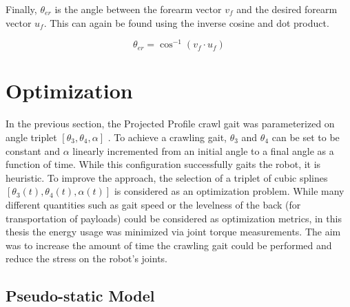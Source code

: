 Finally, $\theta_{er}$ is the angle between the forearm vector $v_f$ and the desired forearm vector $u_f$.
This can again be found using the inverse cosine and dot product.

\begin{equation}
	\theta_{er} = \cos^{-1}(v_{f} \cdot u_{f})
\end{equation}


\section{Optimization} \label{sec:crawl_optimization}

In the previous section, the Projected Profile crawl gait was parameterized on angle triplet 
$[ \theta_3, \theta_4, \alpha ]$ .
To achieve a crawling gait, $\theta_3$ and $\theta_4$ can be set to be constant and $\alpha$ linearly incremented
from an initial angle to a final angle as a function of time. While this configuration successfully gaits the robot,
it is heuristic. To improve the approach, the selection of a triplet of cubic splines 
$[\theta_3(t), \theta_4(t), \alpha(t)]$ is considered as an optimization problem. 
While many different quantities such as gait speed or the levelness of the back 
(for transportation of payloads) could be considered as optimization metrics, in this thesis the energy usage was 
minimized via joint torque measurements.
The aim was to increase the amount of time the crawling gait could be performed and reduce the stress on the robot's joints.

\subsection{Pseudo-static Model} \label{subsec:crawl_pseudo_static_model}

